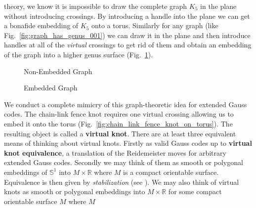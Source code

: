         theory, we know it is impossible to draw the complete graph
        $K_{5}$ in the plane without introducing crossings. By introducing a
        handle into the plane we can get a bonafide embedding of
        $K_{5}$ onto a torus. Similarly for any graph (like
        Fig.~\ref{fig:graph_has_genus_001}) we can draw it in the
        plane and then introduce handles at all of the \textit{virtual}
        crossings to get rid of them and obtain an embedding of the graph
        into a higher genus surface (Fig.~\ref{fig:graph_has_genus_002}).
        \begin{figure}
            \centering
            \begin{minipage}[b]{0.49\textwidth}
                \centering
                \caption{Non-Embedded Graph}
                \label{fig:graph_has_genus_001}
            \end{minipage}
            \hfill
            \begin{minipage}[b]{0.49\textwidth}
                \centering
                \caption{Embedded Graph}
                \label{fig:graph_has_genus_002}
            \end{minipage}
        \end{figure}
        \par\hfill\par
        We conduct a complete mimicry of this graph-theoretic idea for
        extended Gauss codes. The chain-link fence knot requires one
        virtual crossing allowing us to embed it onto the torus
        (Fig.~\ref{fig:chain_link_fence_knot_on_torus}). The resulting object
        is called a \textbf{virtual knot}. There are at least three equivalent
        means of thinking about virtual knots. Firstly as valid Gauss codes
        up to \textbf{virtual knot equivalence}, a translation of the
        Reidemeister moves for arbitrary extended Gauss codes. Secondly we may
        think of them as smooth or polygonal embeddings of $\mathbb{S}^{1}$ into
        $M\times\mathbb{R}$ where $M$ is a compact orientable surface.
        Equivalence is then given by \textit{stabilization}
        (see \cite{CarterKamadaSaitoVirtualKnotCobordisms}). We may also think
        of virtual knots as smooth or polygonal embeddings into
        $M\times\mathbb{R}$ for some compact orientable surface $M$ where $M$
